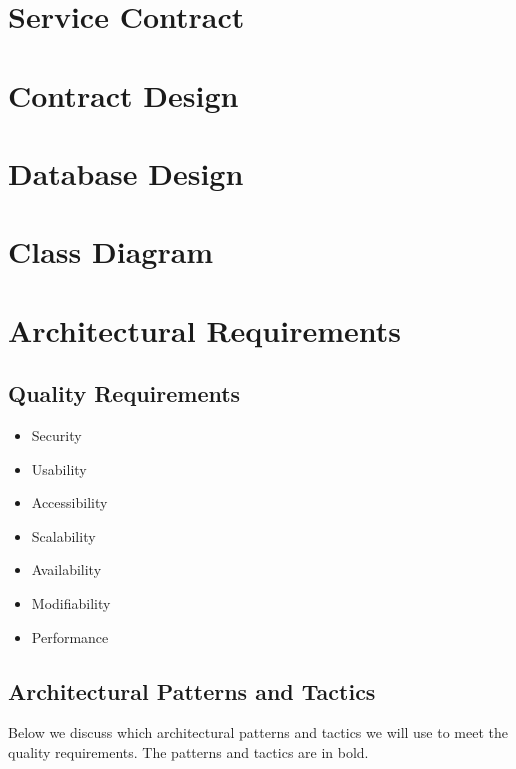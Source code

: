 \documentclass[12pt]{article}
\begin{document}
\newpage

\section{Service Contract}

\newpage

\section{Contract Design}

\newpage

\section{Database Design}

\newpage

\section{Class Diagram}

\newpage

\section{Architectural Requirements}

\subsection{Quality Requirements}

\begin{itemize}
  \item Security
  \item Usability
  \item Accessibility
  \item Scalability
  \item Availability
  \item Modifiability
  \item Performance
\end{itemize}

\subsection{Architectural Patterns and Tactics}

Below we discuss which architectural patterns and tactics we will use to meet the quality requirements. The patterns and tactics are in bold.
\end{document}
